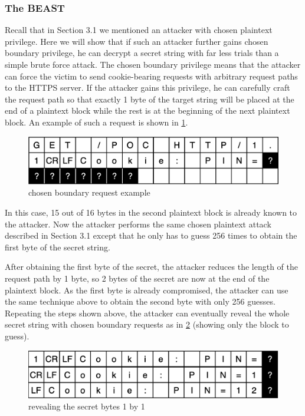 \documentclass{acm_proc_article-sp}
\begin{document}
\subsubsection{The BEAST}
Recall that in Section 3.1 we mentioned an attacker with chosen plaintext privilege. Here we
will show that if such an attacker further gains chosen boundary privilege, he can decrypt a secret
string with far less trials than a simple brute force attack. The chosen boundary privilege means that
the attacker can force the victim to send cookie-bearing requests with arbitrary request paths to the
HTTPS server. If the attacker gains this privilege, he can carefully craft the request path so that
exactly 1 byte of the target string will be placed at the end of a plaintext block while the rest is at the
beginning of the next plaintext block. An example of such a request is shown in \ref{fig:req-example}.

\begin{figure}[htb]
    \centering
    \includegraphics[keepaspectratio, width=\linewidth]{./figures/request-example.png}
    \caption{chosen boundary request example}
    \label{fig:req-example}
\end{figure}
In this case, 15 out of 16 bytes in the second plaintext block is
already known to the attacker. Now the attacker performs the same chosen plaintext attack
described in Section 3.1 except that he only has to guess 256 times to obtain the first byte of the
secret string.

After obtaining the first byte of the secret, the attacker reduces the length of the request path by 1
byte, so 2 bytes of the secret are now at the end of the plaintext block. As the first byte is already
compromised, the attacker can use the same technique above to obtain the second byte with only
256 guesses. Repeating the steps shown above, the attacker can eventually reveal the whole secret
string with chosen boundary requests as in \ref{fig:reveal} (showing only the block to guess).
\begin{figure}[htb]
    \centering
    \includegraphics[keepaspectratio, width=\linewidth]{./figures/revealing.png}
    \caption{revealing the secret bytes 1 by 1}
    \label{fig:reveal}
\end{figure}
\end{document}
